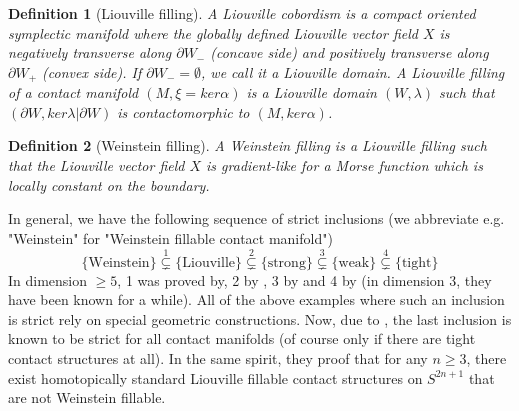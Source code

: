 \documentclass{amsart}
\newtheorem{definition}{Definition}
\begin{document}
\begin{definition}[Liouville filling]
    A Liouville cobordism is a compact oriented symplectic manifold where the globally defined Liouville vector field $X$ is negatively transverse  along $\partial W_-$ (concave side) and positively transverse along $\partial W_+$ (convex side).
    If $\partial W_- = \emptyset$, we call it a Liouville domain.
    A Liouville filling of a contact manifold $(M, \xi = ker \alpha)$ is a Liouville domain $(W, \lambda)$ such that $(\partial W, ker \lambda|\partial W)$ is contactomorphic to $(M, ker \alpha)$.
\end{definition}

\begin{definition}[Weinstein filling]
    A Weinstein filling is a Liouville filling such that the Liouville vector field $X$ is gradient-like for a Morse function which is locally constant on the boundary.
\end{definition}

In general, we have the following sequence of strict inclusions (we abbreviate e.g. "Weinstein" for "Weinstein fillable contact manifold")
\[
      \{\text{Weinstein}\} \overset{1}{\subsetneq} \{\text{Liouville}\} \overset{2}{\subsetneq} \{\text{strong}\} \overset{3}{\subsetneq} \{\text{weak}\} \overset{4}{\subsetneq} \{\text{tight}\}
\]
In dimension $\ge 5$, 1 was proved by\cite[Theorem 1.5]{BCS14}, 2 by \cite{Zhou21}, 3 by \cite{BGM22} and 4 by \cite{MNW13} (in dimension 3, they have been known for a while).
All of the above examples where such an inclusion is strict rely on special geometric
constructions. 
Now, due to \cite{BGMZ22}, the last inclusion is known to be strict for all contact manifolds (of course only if there are tight contact structures at all).
In the same spirit, they proof that for any $n \geq 3$, there exist homotopically standard 
Liouville fillable contact structures on $S^{2n+1}$ that are not Weinstein fillable.
\end{document}
